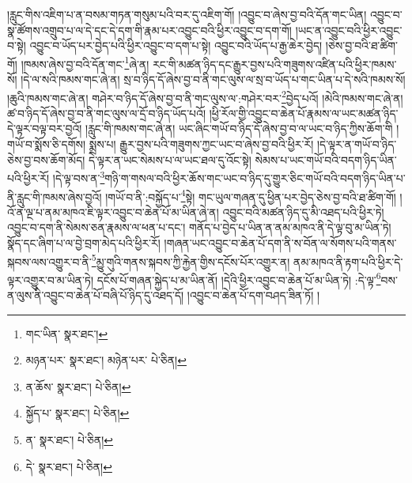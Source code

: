 །རླུང་གིས་འཇིག་པ་ན་བསམ་གཏན་གསུམ་པའི་བར་དུ་འཇིག་གོ། །འབྱུང་བ་ཞེས་བྱ་བའི་དོན་གང་ཡིན། འབྱུང་བ་སྣ་ཚོགས་འགྲུབ་པ་ལ་དེ་དང་དེ་དག་གི་རྣམ་པར་འབྱུང་བའི་ཕྱིར་འབྱུང་བ་དག་གོ། །ཡང་ན་འབྱུང་བའི་ཕྱིར་འབྱུང་བ་སྟེ། འབྱུང་བ་ཡོད་པར་བྱེད་པའི་ཕྱིར་འབྱུང་བ་དག་པ་སྟེ། འབྱུང་བའི་ཡོད་པ་རྒྱ་ཆེར་བྱེད། །ཅེས་བྱ་བའི་ཐ་ཚིག་གོ། །ཁམས་ཞེས་བྱ་བའི་དོན་གང་\footnote{གང་ཡིན་  སྣར་ཐང་། }ཞེ་ན། རང་གི་མཚན་ཉིད་དང་རྒྱུར་བྱས་པའི་གཟུགས་འཛིན་པའི་ཕྱིར་ཁམས་སོ། །དེ་ལ་སའི་ཁམས་གང་ཞེ་ན། སྲ་བ་ཉིད་དོ་ཞེས་བྱ་བ་ནི་གང་ལུས་ལ་སྲ་བ་ཡོད་པ་གང་ཡིན་པ་དེ་སའི་ཁམས་སོ། །ཆུའི་ཁམས་གང་ཞེ་ན། གཤེར་བ་ཉིད་དོ་ཞེས་བྱ་བ་ནི་གང་ལུས་ལ་:གཤེར་བར་\footnote{མཉན་པར་  སྣར་ཐང་། མཉེན་པར་  པེ་ཅིན། }བྱེད་པའོ། །མེའི་ཁམས་གང་ཞེ་ན། ཚ་བ་ཉིད་དོ་ཞེས་བྱ་བ་ནི་གང་ལུས་ལ་དྲོ་བ་ཉིད་ཡོད་པའོ། །ཕྱི་རོལ་གྱི་འབྱུང་བ་ཆེན་པོ་རྣམས་ལ་ཡང་མཚན་ཉིད་དེ་ལྟར་བལྟ་བར་བྱའོ། །རླུང་གི་ཁམས་གང་ཞེ་ན། ཡང་ཞིང་གཡོ་བ་ཉིད་དོ་ཞེས་བྱ་བ་ལ་ཡང་བ་ཉིད་ཀྱིས་ཆོག་གི །གཡོ་བ་སྨོས་ཅི་དགོས། སྨྲས་པ། རྒྱུར་བྱས་པའི་གཟུགས་ཀྱང་ཡང་བ་ཞེས་བྱ་བའི་ཕྱིར་རོ། །དེ་ལྟར་ན་གཡོ་བ་ཉིད་ཅེས་བྱ་བས་ཆོག་མོད། དེ་ལྟར་ན་ཡང་སེམས་པ་ལ་ཡང་ཐལ་དུ་འོང་སྟེ། སེམས་པ་ཡང་གཡོ་བའི་བདག་ཉིད་ཡིན་པའི་ཕྱིར་རོ། །དེ་ལྟ་བས་ན་\footnote{ན་ཆོས་  སྣར་ཐང་།  པེ་ཅིན། }གཉི་ག་གསལ་བའི་ཕྱིར་ཆོས་གང་ཡང་བ་ཉིད་དུ་གྱུར་ཅིང་གཡོ་བའི་བདག་ཉིད་ཡིན་པ་ནི་རླུང་གི་ཁམས་ཞེས་བྱའོ། །གཡོ་བ་ནི་:བསྐྱོད་པ་\footnote{སྐྱོད་པ་  སྣར་ཐང་།  པེ་ཅིན། }སྟེ། གང་ཡུལ་གཞན་དུ་ཕྱིན་པར་བྱེད་ཅེས་བྱ་བའི་ཐ་ཚིག་གོ། །འོ་ན་ལྔ་པ་ནམ་མཁའ་ཇི་ལྟར་འབྱུང་བ་ཆེན་པོ་མ་ཡིན་ཞེ་ན། འབྱུང་བའི་མཚན་ཉིད་དུ་མི་འཐད་པའི་ཕྱིར་ཏེ། འབྱུང་བ་དག་ནི་སེམས་ཅན་རྣམས་ལ་ཕན་པ་དང་། གནོད་པ་བྱེད་པ་ཡིན་ན་ནམ་མཁའ་ནི་དེ་ལྟ་བུ་མ་ཡིན་ཏེ། སྣོད་དང་ཞིག་པ་ལ་བྱེ་བྲག་མེད་པའི་ཕྱིར་རོ། །གཞན་ཡང་འབྱུང་བ་ཆེན་པོ་དག་ནི་ས་བོན་ལ་སོགས་པའི་གནས་སྐབས་ལས་འགྱུར་བ་ནི་\footnote{ན་  སྣར་ཐང་།  པེ་ཅིན། }མྱུ་གུའི་གནས་སྐབས་ཀྱི་རྐྱེན་གྱིས་དངོས་པོར་འགྱུར་ན། ནམ་མཁའ་ནི་རྟག་པའི་ཕྱིར་དེ་ལྟར་འགྱུར་བ་མ་ཡིན་ཏེ། དངོས་པོ་གཞན་སྐྱེད་པ་མ་ཡིན་ནོ། །དེའི་ཕྱིར་འབྱུང་བ་ཆེན་པོ་མ་ཡིན་ཏེ། :དེ་ལྟ་\footnote{དེ་  སྣར་ཐང་།  པེ་ཅིན། }བས་ན་ལུས་ནི་འབྱུང་བ་ཆེན་པོ་བཞི་པོ་ཉིད་དུ་འཐད་དོ། །འབྱུང་བ་ཆེན་པོ་དག་བཤད་ཟིན་ཏོ། །
